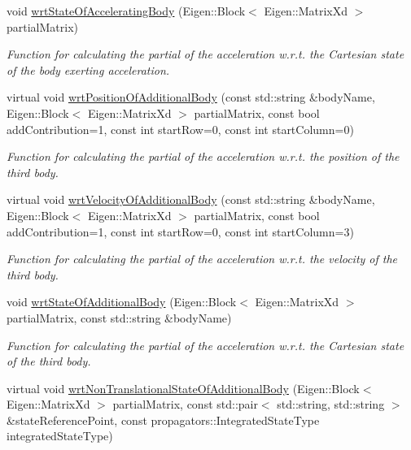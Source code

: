\begin{DoxyCompactItemize}
void \hyperlink{classtudat_1_1acceleration__partials_1_1AccelerationPartial_a8bfba67b7f9e9a3d6021b2b1759fc33e}{wrt\+State\+Of\+Accelerating\+Body} (Eigen\+::\+Block$<$ Eigen\+::\+Matrix\+Xd $>$ partial\+Matrix)
\begin{DoxyCompactList}\small\item\em Function for calculating the partial of the acceleration w.\+r.\+t. the Cartesian state of the body exerting acceleration. \end{DoxyCompactList}\item 
virtual void \hyperlink{classtudat_1_1acceleration__partials_1_1AccelerationPartial_ab222ba1108201aa02e916c64ce82d599}{wrt\+Position\+Of\+Additional\+Body} (const std\+::string \&body\+Name, Eigen\+::\+Block$<$ Eigen\+::\+Matrix\+Xd $>$ partial\+Matrix, const bool add\+Contribution=1, const int start\+Row=0, const int start\+Column=0)
\begin{DoxyCompactList}\small\item\em Function for calculating the partial of the acceleration w.\+r.\+t. the position of the third body. \end{DoxyCompactList}\item 
virtual void \hyperlink{classtudat_1_1acceleration__partials_1_1AccelerationPartial_a1566f99b2cfd42d523c06ee6c1559435}{wrt\+Velocity\+Of\+Additional\+Body} (const std\+::string \&body\+Name, Eigen\+::\+Block$<$ Eigen\+::\+Matrix\+Xd $>$ partial\+Matrix, const bool add\+Contribution=1, const int start\+Row=0, const int start\+Column=3)
\begin{DoxyCompactList}\small\item\em Function for calculating the partial of the acceleration w.\+r.\+t. the velocity of the third body. \end{DoxyCompactList}\item 
void \hyperlink{classtudat_1_1acceleration__partials_1_1AccelerationPartial_a8e21b7ff67f97af2e7e2a963cd0da3b2}{wrt\+State\+Of\+Additional\+Body} (Eigen\+::\+Block$<$ Eigen\+::\+Matrix\+Xd $>$ partial\+Matrix, const std\+::string \&body\+Name)
\begin{DoxyCompactList}\small\item\em Function for calculating the partial of the acceleration w.\+r.\+t. the Cartesian state of the third body. \end{DoxyCompactList}\item 
virtual void \hyperlink{classtudat_1_1acceleration__partials_1_1AccelerationPartial_aaba8dd75dd1d18289a8fc2769d333c36}{wrt\+Non\+Translational\+State\+Of\+Additional\+Body} (Eigen\+::\+Block$<$ Eigen\+::\+Matrix\+Xd $>$ partial\+Matrix, const std\+::pair$<$ std\+::string, std\+::string $>$ \&state\+Reference\+Point, const propagators\+::\+Integrated\+State\+Type integrated\+State\+Type)

\end{DoxyCompactItemize}
